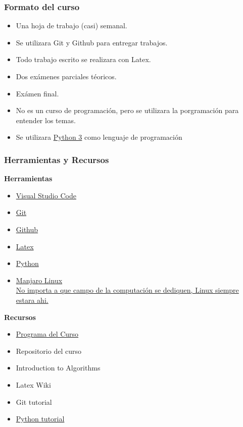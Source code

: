 \documentclass{beamer}
\begin{document}
\begin{frame}
    \frametitle{Formato del curso}
    \begin{itemize}
        \item{Una hoja de trabajo (casi) semanal.}
        \item{Se utilizara Git y Github para entregar trabajos.}
        \item{Todo trabajo escrito se realizara con Latex.}
        \item{Dos ex\'amenes parciales t\'eoricos.}
        \item{Ex\'amen final.}
        \item{No es un curso de programaci\'on, pero
        se utilizara la porgramaci\'on para entender los temas.}
        \item{Se utilizara \href{https://www.python.org/}{Python 3} como lenguaje de programaci\'on}
    \end{itemize}
\end{frame}

\begin{frame}
\frametitle{Herramientas y Recursos}
\begin{multicols*}{2}
    {\bf Herramientas} \\
\begin{itemize}
    \item \href{https://code.visualstudio.com/}{Visual Studio Code}
    \item \href{https://git-scm.com/}{Git}
    \item \href{https://github.com/}{Github}
    \item \href{https://www.latex-project.org/}{Latex}
    \item \href{https://www.python.org/}{Python}
    \item \href{https://manjaro.org/}{Manjaro Linux\\
    \tiny{No importa a que campo de la computaci\'on se dediquen,
        Linux siempre estara ahi.}}
\end{itemize}
\columnbreak
{\bf Recursos}
\begin{itemize}
    \item{\href{https://github.com/netogallo/algoritmos-ufm-2018/blob/master/recursos/Programa.pdf}{Programa del Curso}}
    \item{Repositorio del curso \cite{Repositorio}}
    \item{Introduction to Algorithms \cite{Algoritmos}}
    \item Latex Wiki \cite{Latex}
    \item Git tutorial \cite{GitTutorial}
    \item{\href{https://docs.python.org/3/tutorial/index.html}{Python tutorial}}
\end{itemize}
\end{multicols*}
\end{frame}
\end{document}
